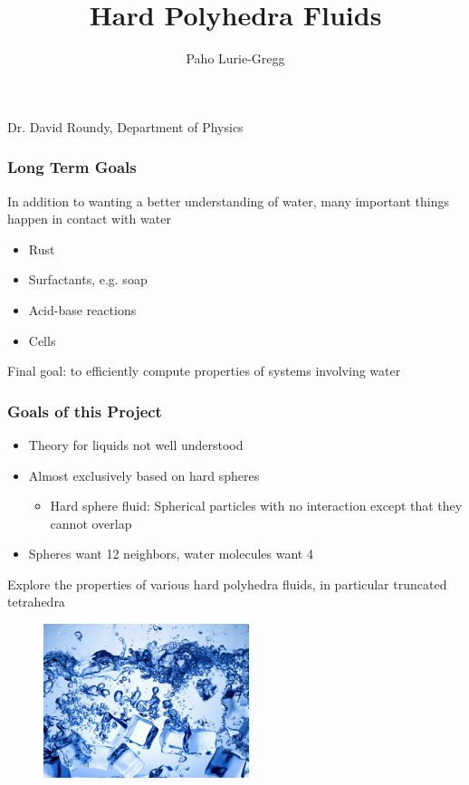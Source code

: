 \documentclass[]{beamer}
\title{Hard Polyhedra Fluids}
\author{Paho Lurie-Gregg}
\date{}
\begin{document}
{
  \begin{frame}
    \maketitle
    \begin{center}
      Dr. David Roundy, Department of Physics
      \vspace{1.5in}
    \end{center}

  \end{frame}
}


\begin{frame}
  \frametitle{Long Term Goals}
  In addition to wanting a better understanding of water, many important things happen in contact with water
  \begin{itemize}
  \item Rust
  \item Surfactants, e.g. soap
  \item Acid-base reactions
  \item Cells
  \end{itemize}\vspace{.5in}
  Final goal: to efficiently compute properties of systems involving water
\end{frame}

\begin{frame}
  \frametitle{Goals of this Project}
  \begin{itemize}\itemsep2ex
  \item Theory for liquids not well understood
  \item Almost exclusively based on hard spheres
    \begin{itemize}
    \item Hard sphere fluid: Spherical particles with no interaction except that they cannot overlap
    \end{itemize}
  \item Spheres want 12 neighbors, water molecules want 4
  \end{itemize}\vspace{.25in}
  Explore the properties of various hard polyhedra fluids, in particular truncated tetrahedra

  \begin{figure}[b]
    \includegraphics[width=60mm]{figs/ice-water.png}
  \end{figure}

\end{frame}
\end{document}
